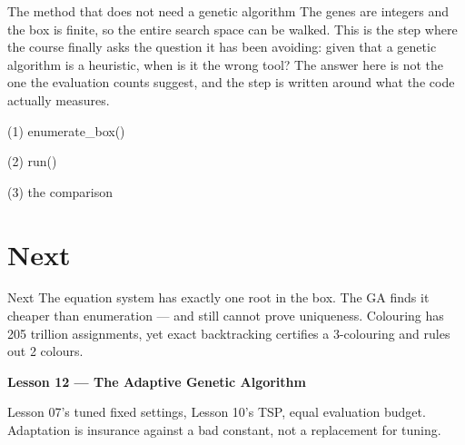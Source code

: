 \begin{frame}{The method that does not need a genetic algorithm}
The genes are integers and the box is finite, so the entire search space can be
walked. This is the step where the course finally asks the question it has been
avoiding: given that a genetic algorithm is a heuristic, when is it the wrong
tool? The answer here is not the one the evaluation counts suggest, and the
step is written around what the code actually measures.
\end{frame}

\begin{frame}[fragile]{(1) enumerate\_box()}

\end{frame}

\begin{frame}[fragile]{(2) run()}

\end{frame}

\begin{frame}[fragile]{(3) the comparison}

\end{frame}


\section{Next}

\begin{frame}{Next}
The equation system has exactly one root in the box. The GA finds it cheaper than enumeration --- and still cannot prove uniqueness. Colouring has 205 trillion assignments, yet exact backtracking certifies a 3-colouring and rules out 2 colours.

\vspace{0.8em}
\textbf{Lesson 12 --- The Adaptive Genetic Algorithm}

Lesson 07's tuned fixed settings, Lesson 10's TSP, equal evaluation budget. Adaptation is insurance against a bad constant, not a replacement for tuning.
\end{frame}


